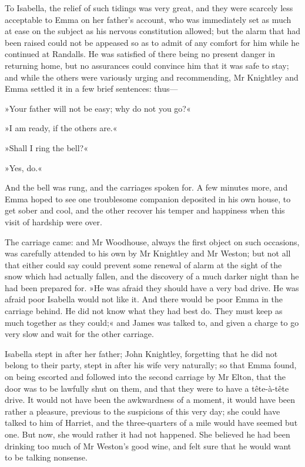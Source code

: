 To Isabella, the relief of such tidings was very great, and they were scarcely less acceptable to Emma on her father's account, who was immediately set as much at ease on the subject as his nervous constitution allowed; but the alarm that had been raised could not be appeased so as to admit of any comfort for him while he continued at Randalls. He was satisfied of there being no present danger in returning home, but no assurances could convince him that it was safe to stay; and while the others were variously urging and recommending, Mr Knightley and Emma settled it in a few brief sentences: thus—

»Your father will not be easy; why do not you go?«

»I am ready, if the others are.«

»Shall I ring the bell?«

»Yes, do.«

And the bell was rung, and the carriages spoken for. A few minutes more, and Emma hoped to see one troublesome companion deposited in his own house, to get sober and cool, and the other recover his temper and happiness when this visit of hardship were over.

The carriage came: and Mr Woodhouse, always the first object on such occasions, was carefully attended to his own by Mr Knightley and Mr Weston; but not all that either could say could prevent some renewal of alarm at the sight of the snow which had actually fallen, and the discovery of a much darker night than he had been prepared for. »He was afraid they should have a very bad drive. He was afraid poor Isabella would not like it. And there would be poor Emma in the carriage behind. He did not know what they had best do. They must keep as much together as they could;« and James was talked to, and given a charge to go very slow and wait for the other carriage.

Isabella stept in after her father; John Knightley, forgetting that he did not belong to their party, stept in after his wife very naturally; so that Emma found, on being escorted and followed into the second carriage by Mr Elton, that the door was to be lawfully shut on them, and that they were to have a tête-à-tête drive. It would not have been the awkwardness of a moment, it would have been rather a pleasure, previous to the suspicions of this very day; she could have talked to him of Harriet, and the three-quarters of a mile would have seemed but one. But now, she would rather it had not happened. She believed he had been drinking too much of Mr Weston's good wine, and felt sure that he would want to be talking nonsense.

